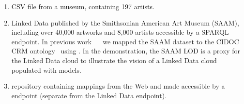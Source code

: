 \begin{enumerate}
\item CSV file from a museum, containing 197 artists. 
\item Linked Data published by the Smithsonian American Art Museum (SAAM), including over 40,000 artworks and 8,000 artists accessible by a SPARQL endpoint. 
In previous work~\cite{Szekely:2013vq} ~ we mapped the SAAM dataset to the CIDOC CRM ontology~\cite{Doerr:2003:CCR:958671.958678} using \rtworml.
In the demonstration, the SAAM LOD is a proxy for the Linked Data cloud to illustrate the vision of a Linked Data cloud populated with \rtworml models.
\item \rtworml repository containing \rtworml mappings from the Web and made accessible by a \sparql endpoint (separate from the Linked Data endpoint).
\end{enumerate}
